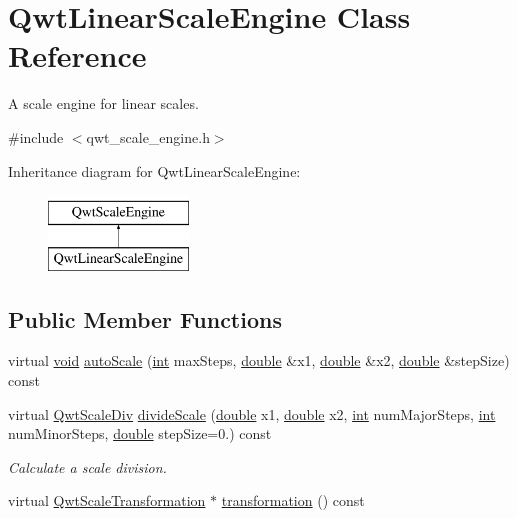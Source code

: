 \hypertarget{class_qwt_linear_scale_engine}{\section{Qwt\-Linear\-Scale\-Engine Class Reference}
\label{class_qwt_linear_scale_engine}
}


A scale engine for linear scales.  




{\ttfamily \#include $<$qwt\-\_\-scale\-\_\-engine.\-h$>$}

Inheritance diagram for Qwt\-Linear\-Scale\-Engine\-:\begin{figure}[H]
\begin{center}
\leavevmode
\includegraphics[height=2.000000cm]{class_qwt_linear_scale_engine}
\end{center}
\end{figure}
\subsection*{Public Member Functions}
\begin{DoxyCompactItemize}
\item 
virtual \hyperlink{group___u_a_v_objects_plugin_ga444cf2ff3f0ecbe028adce838d373f5c}{void} \hyperlink{class_qwt_linear_scale_engine_ad0f1d825e70eb7a1deb15875a8093cff}{auto\-Scale} (\hyperlink{ioapi_8h_a787fa3cf048117ba7123753c1e74fcd6}{int} max\-Steps, \hyperlink{_super_l_u_support_8h_a8956b2b9f49bf918deed98379d159ca7}{double} \&x1, \hyperlink{_super_l_u_support_8h_a8956b2b9f49bf918deed98379d159ca7}{double} \&x2, \hyperlink{_super_l_u_support_8h_a8956b2b9f49bf918deed98379d159ca7}{double} \&step\-Size) const 
\item 
virtual \hyperlink{class_qwt_scale_div}{Qwt\-Scale\-Div} \hyperlink{class_qwt_linear_scale_engine_aafed94c688e67c95a6ecf18e8bb522ab}{divide\-Scale} (\hyperlink{_super_l_u_support_8h_a8956b2b9f49bf918deed98379d159ca7}{double} x1, \hyperlink{_super_l_u_support_8h_a8956b2b9f49bf918deed98379d159ca7}{double} x2, \hyperlink{ioapi_8h_a787fa3cf048117ba7123753c1e74fcd6}{int} num\-Major\-Steps, \hyperlink{ioapi_8h_a787fa3cf048117ba7123753c1e74fcd6}{int} num\-Minor\-Steps, \hyperlink{_super_l_u_support_8h_a8956b2b9f49bf918deed98379d159ca7}{double} step\-Size=0.) const 
\begin{DoxyCompactList}\small\item\em Calculate a scale division. \end{DoxyCompactList}\item 
virtual \hyperlink{class_qwt_scale_transformation}{Qwt\-Scale\-Transformation} $\ast$ \hyperlink{class_qwt_linear_scale_engine_adb24f92fa0e8c0548a38cd310158b3d3}{transformation} () const 
\end{DoxyCompactItemize}
